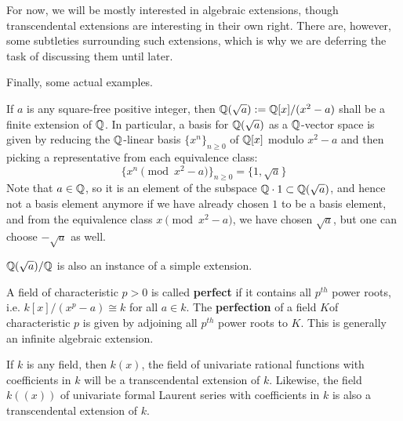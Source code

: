         For now, we will be mostly interested in algebraic extensions, though transcendental extensions are interesting in their own right. There are, however, some subtleties surrounding such extensions, which is why we are deferring the task of discussing them until later.

        Finally, some actual examples.
        \begin{example} \label{example: quadratic_extensions}
            If $a$ is any square-free positive integer, then $\mathbb{Q}(\sqrt{a}) := \mathbb{Q}[x]/(x^2 - a)$ shall be a finite extension of $\mathbb{Q}$. In particular, a basis for $\mathbb{Q}(\sqrt{a})$ as a $\mathbb{Q}$-vector space is given by reducing the $\mathbb{Q}$-linear basis $\{x^n\}_{n \geq 0}$ of $\mathbb{Q}[x]$ modulo $x^2 - a$ and then picking a representative from each equivalence class:
                $$\{x^n \pmod{x^2 - a}\}_{n \geq 0} = \{1, \sqrt{a}\}$$
            Note that $a \in \mathbb{Q}$, so it is an element of the subspace $\mathbb{Q} \cdot 1 \subset \mathbb{Q}(\sqrt{a})$, and hence not a basis element anymore if we have already chosen $1$ to be a basis element, and from the equivalence class $x \pmod{x^2 - a}$, we have chosen $\sqrt{a}$, but one can choose $-\sqrt{a}$ as well.

            $\mathbb{Q}(\sqrt{a})/\mathbb{Q}$ is also an instance of a simple extension.
        \end{example}
        \begin{example} \label{example: perfect_fields}
            A field of characteristic $p > 0$ is called \textbf{perfect} if it contains all $p^{th}$ power roots, i.e. $k[x]/(x^p - a) \cong k$ for all $a \in k$. The \textbf{perfection} of a field $K $of characteristic $p$ is given by adjoining all $p^{th}$ power roots to $K$. This is generally an infinite algebraic extension.
        \end{example}
        \begin{example} \label{example: transcendental_extension}
            If $k$ is any field, then $k(x)$, the field of univariate rational functions with coefficients in $k$ will be a transcendental extension of $k$. Likewise, the field $k(\!(x)\!)$ of univariate formal Laurent series with coefficients in $k$ is also a transcendental extension of $k$.
        \end{example}

